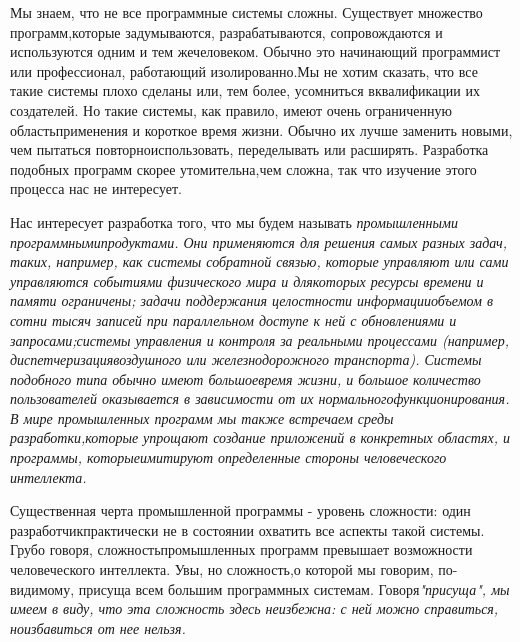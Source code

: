 \documentclass[11pt]{article}
\begin{document}
Мы знаем, что не все программные системы сложны. Существует множество программ,\linebreak которые задумываются, разрабатываются, сопровождаются и используются одним и тем же\linebreak человеком. Обычно это начинающий программист или профессионал, работающий изолированно.\linebreak Мы не хотим сказать, что все такие системы плохо сделаны или, тем более, усомниться в\linebreak квалификации их создателей. Но такие системы, как правило, имеют очень ограниченную область\linebreak применения и короткое время жизни. Обычно их лучше заменить новыми, чем пытаться повторно\linebreak использовать, переделывать или расширять. Разработка подобных программ скорее утомительна,\linebreak чем сложна, так что изучение этого процесса нас не интересует. \bigskip

Нас интересует разработка того, что мы будем называть \it промышленными программными\linebreak продуктами. \rm Они применяются для решения самых разных задач, таких, например, как системы с\linebreak обратной связью, которые управляют или сами управляются событиями физического мира и для\linebreak которых ресурсы времени и памяти ограничены; задачи поддержания целостности информации\linebreak объемом в сотни тысяч записей при параллельном доступе к ней с обновлениями и запросами;\linebreak системы управления и контроля за реальными процессами (например, диспетчеризация\linebreak воздушного или железнодорожного транспорта). Системы подобного типа обычно имеют большое\linebreak время жизни, и большое количество пользователей оказывается в зависимости от их нормального\linebreak функционирования. В мире промышленных программ мы также встречаем среды разработки,\linebreak которые упрощают создание приложений в конкретных областях, и программы, которые\linebreak имитируют определенные стороны человеческого интеллекта. \bigskip

Существенная черта промышленной программы - уровень сложности: один разработчик\linebreak практически не в состоянии охватить все аспекты такой системы. Грубо говоря, сложность\linebreak промышленных программ превышает возможности человеческого интеллекта. Увы, но сложность,\linebreak о которой мы говорим, по-видимому, присуща всем большим программных системам. Говоря\linebreak \it "присуща", \rm мы имеем в виду, что эта сложность здесь неизбежна: с ней можно справиться, но\linebreak избавиться от нее нельзя. \bigskip
\end{document}
